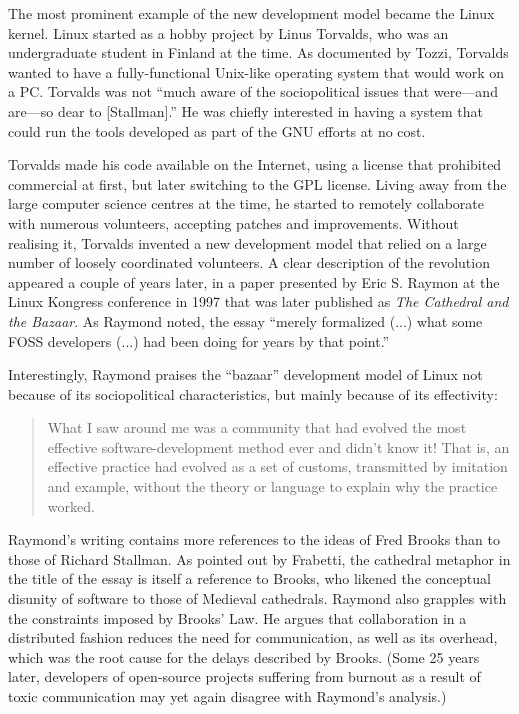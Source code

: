 The most prominent example of the new development model became the Linux kernel.
Linux started as a hobby project by Linus Torvalds, who was an undergraduate student in Finland
at the time. As documented by Tozzi, Torvalds wanted to have a
fully-functional Unix-like operating system that would work on a PC. Torvalds was not
``much aware of the sociopolitical issues that were---and are---so dear to
[Stallman].'' He was chiefly interested in having a system
that could run the tools developed as part of the GNU efforts at no cost.

Torvalds made his code available on the Internet, using a license that prohibited
commercial at first, but later switching to the GPL license. Living away from the large
computer science centres at the time, he started to remotely collaborate with numerous
volunteers, accepting patches and improvements.
Without realising it, Torvalds invented a new development model that relied on a large number
of loosely coordinated volunteers. A clear description of the revolution appeared a couple
of years later, in a paper presented by Eric S. Raymon at the Linux Kongress conference
in 1997 that was later published as \emph{The Cathedral and the
Bazaar}. As Raymond noted, the essay ``merely formalized
(...) what some FOSS developers (...) had been doing for years by that
point.''

Interestingly, Raymond praises the ``bazaar'' development model of Linux not
because of its sociopolitical characteristics, but mainly because of its effectivity:

\begin{quote}
What I saw around me was a community that had evolved the most effective software-development
method ever and didn't know it! That is, an effective practice had evolved as a set of customs,
transmitted by imitation and example, without the theory or language to explain why the practice
worked.
\end{quote}

Raymond's writing contains more references to the ideas of Fred Brooks than to those of
Richard Stallman. As pointed out by Frabetti, the cathedral metaphor
in the title of the essay is itself a reference to Brooks, who likened the conceptual disunity of software to
those of Medieval cathedrals. Raymond also grapples with
the constraints imposed by Brooks' Law. He argues that collaboration in a distributed fashion
reduces the need for communication, as well as its overhead, which was the root cause for the
delays described by Brooks. (Some 25 years later, developers of open-source projects suffering from
burnout as a result of toxic communication may yet again disagree with Raymond's
analysis.)

